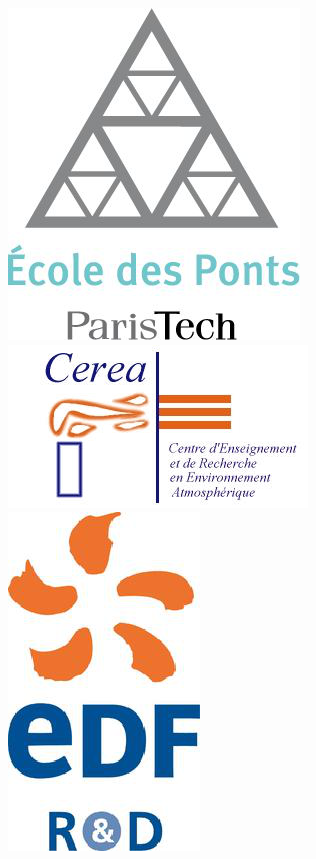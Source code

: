 
\titlepage

    \begin{figure}
        \begin{minipage}[c]{0.15\linewidth}
            \begin{center}
                \includegraphics[height=0.09\textheight]{./logos/enpc}
            \end{center}
        \end{minipage}
        \hfill
        \begin{minipage}[c]{0.15\linewidth}
            \begin{center}
                \includegraphics[height=0.09\textheight]{./logos/cerea}
            \end{center}
        \end{minipage}
        \hfill
        \begin{minipage}[c]{0.15\linewidth}
            \begin{center}
                \includegraphics[height=0.09\textheight]{./logos/edf}

\end{center}
\end{minipage}
\end{figure}
